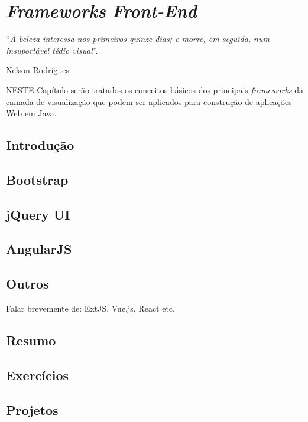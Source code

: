 \chapter{\textit{Frameworks} \textit{Front-End}}\label{cap:frameworksFront}
\epigraph{``\textit{A beleza interessa nos primeiros quinze dias; e morre, em seguida, num insuportável tédio visual}''.}{Nelson Rodrigues}

\lettrine[lines=4, lhang=0.1, lraise=0, loversize=0.2, findent=0.1em]{\textcolor{corAzulTema}{N}}{ESTE} Capítulo serão tratados os conceitos básicos dos principais \textit{frameworks} da camada de visualização que podem ser aplicados para construção de aplicações Web em Java.

\section{Introdução}

\section{Bootstrap}

\section{jQuery UI}

\section{AngularJS}

\section{Outros}

Falar brevemente de: ExtJS, Vue.js, React etc.

\section{Resumo}

\section{Exercícios}

\section{Projetos}
